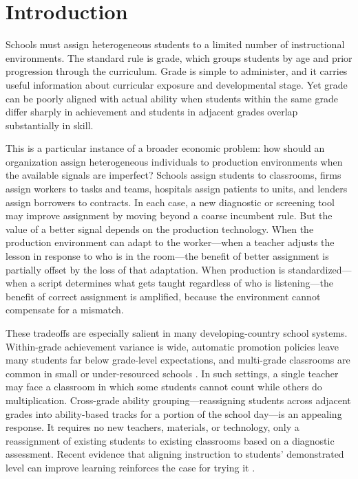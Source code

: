 \documentclass[11pt]{article}
\begin{document}
\section{Introduction}
\label{sec:intro}

Schools must assign heterogeneous students to a limited number of instructional environments. The standard rule is grade, which groups students by age and prior progression through the curriculum. Grade is simple to administer, and it carries useful information about curricular exposure and developmental stage. Yet grade can be poorly aligned with actual ability when students within the same grade differ sharply in achievement and students in adjacent grades overlap substantially in skill.

This is a particular instance of a broader economic problem: how should an organization assign heterogeneous individuals to production environments when the available signals are imperfect? Schools assign students to classrooms, firms assign workers to tasks and teams, hospitals assign patients to units, and lenders assign borrowers to contracts. In each case, a new diagnostic or screening tool may improve assignment by moving beyond a coarse incumbent rule. But the value of a better signal depends on the production technology. When the production environment can adapt to the worker---when a teacher adjusts the lesson in response to who is in the room---the benefit of better assignment is partially offset by the loss of that adaptation. When production is standardized---when a script determines what gets taught regardless of who is listening---the benefit of correct assignment is amplified, because the environment cannot compensate for a mismatch.

These tradeoffs are especially salient in many developing-country school systems. Within-grade achievement variance is wide, automatic promotion policies leave many students far below grade-level expectations, and multi-grade classrooms are common in small or under-resourced schools \citep{banerjee/cole/duflo/linden:2007,muralidharan2019disrupting}. In such settings, a single teacher may face a classroom in which some students cannot count while others do multiplication. Cross-grade ability grouping---reassigning students across adjacent grades into ability-based tracks for a portion of the school day---is an appealing response. It requires no new teachers, materials, or technology, only a reassignment of existing students to existing classrooms based on a diagnostic assessment. Recent evidence that aligning instruction to students' demonstrated level can improve learning reinforces the case for trying it \citep{duflo2020experimental, duflo2011peer}.
\end{document}
